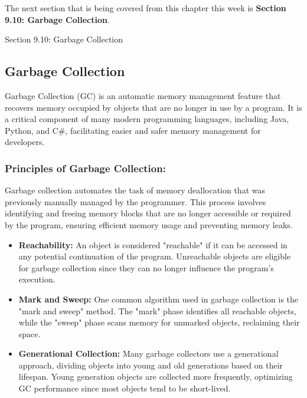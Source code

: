 The next section that is being covered from this chapter this week is \textbf{Section 9.10: Garbage Collection}.

\begin{notes}{Section 9.10: Garbage Collection}
    \subsection*{Garbage Collection}

    Garbage Collection (GC) is an automatic memory management feature that recovers memory occupied by objects that are no longer in use by a program. It is a critical component of many modern programming 
    languages, including Java, Python, and C#, facilitating easier and safer memory management for developers. \vspace*{1em}
    
    \subsubsection*{Principles of Garbage Collection:}
    
    Garbage collection automates the task of memory deallocation that was previously manually managed by the programmer. This process involves identifying and freeing memory blocks that are no longer 
    accessible or required by the program, ensuring efficient memory usage and preventing memory leaks.
    
    \begin{itemize}
        \item \textbf{Reachability:} An object is considered "reachable" if it can be accessed in any potential continuation of the program. Unreachable objects are eligible for garbage collection 
        since they can no longer influence the program's execution.
        \item \textbf{Mark and Sweep:} One common algorithm used in garbage collection is the "mark and sweep" method. The "mark" phase identifies all reachable objects, while the "sweep" phase scans 
        memory for unmarked objects, reclaiming their space.
        \item \textbf{Generational Collection:} Many garbage collectors use a generational approach, dividing objects into young and old generations based on their lifespan. Young generation objects 
        are collected more frequently, optimizing GC performance since most objects tend to be short-lived.
    \end{itemize}
    

\end{notes}
